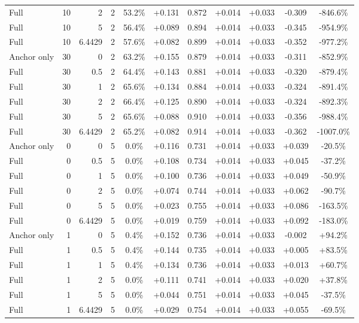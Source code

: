 \begin{table}[htbp]
\begin{tabular}{lrrrccccccc}
Full & 10 & 2 & 2 & 53.2\% & +0.131 & 0.872 & +0.014 & +0.033 & -0.309 & -846.6\% \\
Full & 10 & 5 & 2 & 56.4\% & +0.089 & 0.894 & +0.014 & +0.033 & -0.345 & -954.9\% \\
Full & 10 & 6.4429 & 2 & 57.6\% & +0.082 & 0.899 & +0.014 & +0.033 & -0.352 & -977.2\% \\
Anchor only & 30 & 0 & 2 & 63.2\% & +0.155 & 0.879 & +0.014 & +0.033 & -0.311 & -852.9\% \\
Full & 30 & 0.5 & 2 & 64.4\% & +0.143 & 0.881 & +0.014 & +0.033 & -0.320 & -879.4\% \\
Full & 30 & 1 & 2 & 65.6\% & +0.134 & 0.884 & +0.014 & +0.033 & -0.324 & -891.4\% \\
Full & 30 & 2 & 2 & 66.4\% & +0.125 & 0.890 & +0.014 & +0.033 & -0.324 & -892.3\% \\
Full & 30 & 5 & 2 & 65.6\% & +0.088 & 0.910 & +0.014 & +0.033 & -0.356 & -988.4\% \\
Full & 30 & 6.4429 & 2 & 65.2\% & +0.082 & 0.914 & +0.014 & +0.033 & -0.362 & -1007.0\% \\
Anchor only & 0 & 0 & 5 & 0.0\% & +0.116 & 0.731 & +0.014 & +0.033 & +0.039 & -20.5\% \\
Full & 0 & 0.5 & 5 & 0.0\% & +0.108 & 0.734 & +0.014 & +0.033 & +0.045 & -37.2\% \\
Full & 0 & 1 & 5 & 0.0\% & +0.100 & 0.736 & +0.014 & +0.033 & +0.049 & -50.9\% \\
Full & 0 & 2 & 5 & 0.0\% & +0.074 & 0.744 & +0.014 & +0.033 & +0.062 & -90.7\% \\
Full & 0 & 5 & 5 & 0.0\% & +0.023 & 0.755 & +0.014 & +0.033 & +0.086 & -163.5\% \\
Full & 0 & 6.4429 & 5 & 0.0\% & +0.019 & 0.759 & +0.014 & +0.033 & +0.092 & -183.0\% \\
Anchor only & 1 & 0 & 5 & 0.4\% & +0.152 & 0.736 & +0.014 & +0.033 & -0.002 & +94.2\% \\
Full & 1 & 0.5 & 5 & 0.4\% & +0.144 & 0.735 & +0.014 & +0.033 & +0.005 & +83.5\% \\
Full & 1 & 1 & 5 & 0.4\% & +0.134 & 0.736 & +0.014 & +0.033 & +0.013 & +60.7\% \\
Full & 1 & 2 & 5 & 0.0\% & +0.111 & 0.741 & +0.014 & +0.033 & +0.020 & +37.8\% \\
Full & 1 & 5 & 5 & 0.0\% & +0.044 & 0.751 & +0.014 & +0.033 & +0.045 & -37.5\% \\
Full & 1 & 6.4429 & 5 & 0.0\% & +0.029 & 0.754 & +0.014 & +0.033 & +0.055 & -69.5\% \\

\end{tabular}
\end{table}
